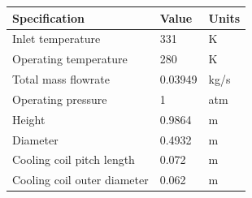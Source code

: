 \begin{table}[H]
\centering
\begin{tabular}{@{}l|l|l@{}}
\toprule
\textbf{Specification}                  & \textbf{Value} & \textbf{Units}    \\ \midrule
Inlet temperature                       & 331             & K                \\ \midrule
Operating temperature                   & 280             & K                \\ \midrule
Total mass  flowrate                    & 0.03949         & kg/s             \\ \midrule
Operating pressure                      & 1               & atm               \\ \midrule
Height                                  & 0.9864          & m                 \\ \midrule
Diameter                                & 0.4932          & m                 \\ \midrule
Cooling coil pitch length               & 0.072           & m                 \\ \midrule
Cooling coil outer diameter             & 0.062           & m                  \\ \bottomrule
\end{tabular}
\end{table}